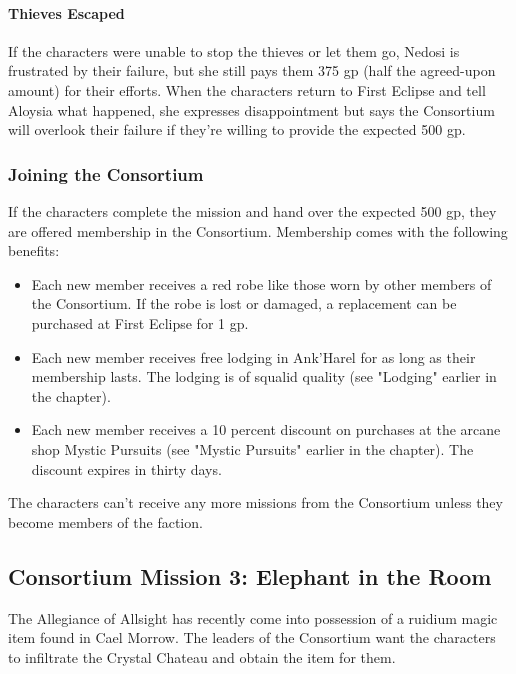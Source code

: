 \documentclass[10pt,a4,twoside,twocolumn,openany,nodeprecatedcode]{dndbook}
\begin{document}
\paragraph{Thieves Escaped}
If the characters were unable to stop the thieves or let them go, Nedosi is frustrated by their failure, but she still pays them 375 gp (half the agreed-upon amount) for their efforts.
When the characters return to First Eclipse and tell Aloysia what happened, she expresses disappointment but says the Consortium will overlook their failure if they're willing to provide the expected 500 gp.
\subsubsection{Joining the Consortium}
If the characters complete the mission and hand over the expected 500 gp, they are offered membership in the Consortium. Membership comes with the following benefits:
\begin{itemize}

\item Each new member receives a red robe like those worn by other members of the Consortium. If the robe is lost or damaged, a replacement can be purchased at First Eclipse for 1 gp.
\item Each new member receives free lodging in Ank'Harel for as long as their membership lasts. The lodging is of squalid quality (see "Lodging" earlier in the chapter).
\item Each new member receives a 10 percent discount on purchases at the arcane shop Mystic Pursuits (see "Mystic Pursuits" earlier in the chapter). The discount expires in thirty days.
\end{itemize}


The characters can't receive any more missions from the Consortium unless they become members of the faction.
\subsection{Consortium Mission 3: Elephant in the Room}
The Allegiance of Allsight has recently come into possession of a ruidium magic item found in Cael Morrow. The leaders of the Consortium want the characters to infiltrate the Crystal Chateau and obtain the item for them.
\end{document}
